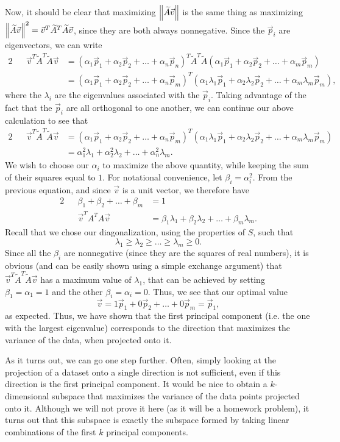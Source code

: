 \documentclass[letterpaper]{article}
\theoremstyle{remark}
\renewcommand{\tilde}[1]{\widetilde{#1}}
\newcommand{\eqn}[1]{\begin{alignat*}{2}#1\end{alignat*}}
\begin{document}
Now, it should be clear that maximizing $\norm{\tilde{A}\vec{v}}$ is the same thing as maximizing $\norm{\tilde{A}\vec{v}}^2 = \vec{v}^T\tilde{A}^T\tilde{A}\vec{v}$, since they are both always nonnegative. Since the $\vec{p}_i$ are eigenvectors, we can write
\eqn{
    && \vec{v}^T\tilde{A}^T\tilde{A}\vec{v} &= (\alpha_1 \vec{p}_1 + \alpha_2 \vec{p}_2 + \ldots + \alpha_n \vec{p}_n)^T\tilde{A}^T\tilde{A}(\alpha_1 \vec{p}_1 + \alpha_2 \vec{p}_2 + \ldots + \alpha_m \vec{p}_m) \\
    &&&= (\alpha_1 \vec{p}_1 + \alpha_2 \vec{p}_2 + \ldots + \alpha_n \vec{p}_m)^T(\alpha_1 \lambda_1 \vec{p}_1 + \alpha_2 \lambda_2 \vec{p}_2 + \ldots + \alpha_m \lambda_m \vec{p}_m),
}
where the $\lambda_i$ are the eigenvalues associated with the $\vec{p}_i$. Taking advantage of the fact that the $\vec{p}_i$ are all orthogonal to one another, we can continue our above calculation to see that
\eqn{
    && \vec{v}^T\tilde{A}^T\tilde{A}\vec{v} &= (\alpha_1 \vec{p}_1 + \alpha_2 \vec{p}_2 + \ldots + \alpha_n \vec{p}_m)^T(\alpha_1 \lambda_1 \vec{p}_1 + \alpha_2 \lambda_2 \vec{p}_2 + \ldots + \alpha_m \lambda_m \vec{p}_m) \\
    &&&= \alpha_1^2 \lambda_1 + \alpha_2^2 \lambda_2 + \ldots + \alpha_n^2 \lambda_m.
}
We wish to choose our $\alpha_i$ to maximize the above quantity, while keeping the sum of their squares equal to $1$. For notational convenience, let $\beta_i = \alpha_i^2$. From the previous equation, and since $\vec{v}$ is a unit vector, we therefore have
\eqn{
    && \beta_1 + \beta_2 + \ldots + \beta_m &= 1 \\
    && \vec{v}^TA^TA\vec{v} &= \beta_1\lambda_1 + \beta_2\lambda_2 + \ldots + \beta_m\lambda_m.
}
Recall that we chose our diagonalization, using the properties of $S$, such that
\[
    \lambda_1 \ge \lambda_2 \ge \ldots \ge \lambda_m \ge 0.
\]
Since all the $\beta_i$ are nonnegative (since they are the squares of real numbers), it is obvious (and can be easily shown using a simple exchange argument) that $\vec{v}^T\tilde{A}^T\tilde{A}\vec{v}$ has a maximum value of $\lambda_1$, that can be achieved by setting $\beta_1 = \alpha_1 = 1$ and the other $\beta_i = \alpha_i = 0$. Thus, we see that our optimal value
\[
    \vec{v} = 1 \vec{p}_1 + 0 \vec{p}_2 + \ldots + 0 \vec{p}_m = \vec{p}_1,
\]
as expected. Thus, we have shown that the first principal component (i.e. the one with the largest eigenvalue) corresponds to the direction that maximizes the variance of the data, when projected onto it.

As it turns out, we can go one step further. Often, simply looking at the projection of a dataset onto a single direction is not sufficient, even if this direction is the first principal component. It would be nice to obtain a $k$-dimensional subspace that maximizes the variance of the data points projected onto it. Although we will not prove it here (as it will be a homework problem), it turns out that this subspace is exactly the subspace formed by taking linear combinations of the first $k$ principal components.
\end{document}
